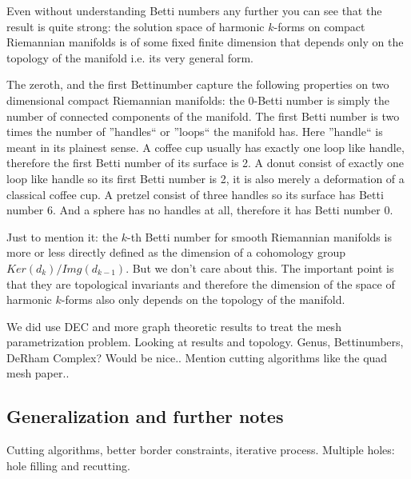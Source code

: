 Even without understanding Betti numbers any further you can see that the result is quite strong: the solution space of harmonic $k$-forms on compact Riemannian manifolds is of some fixed finite dimension that depends only on the topology of the manifold i.e. its very general form. 

The zeroth, and the first Bettinumber capture the following properties on two dimensional compact Riemannian manifolds: the 0-Betti number is simply the number of connected components of the manifold. The first Betti number is two times the number of ''handles`` or ''loops`` the manifold has. Here ''handle`` is meant in its plainest sense. A coffee cup usually has exactly one loop like handle, therefore the first Betti number of its surface is 2. A donut consist of exactly one loop like handle so its first Betti number is 2, it is also merely a deformation of a classical coffee cup. A pretzel consist of three handles so its surface has Betti number 6. And a sphere has no handles at all, therefore it has Betti number 0. 


Just to mention it: the $k$-th Betti number for smooth Riemannian manifolds is more or less directly defined as the dimension of a cohomology group $Ker(d_k)/Img(d_{k-1})$. But we don't care about this. The important point is that they are topological invariants and therefore the dimension of the space of harmonic $k$-forms also only depends on the topology of the manifold.




We did use DEC and more graph theoretic results to treat the mesh parametrization problem. 
		Looking at results and topology. Genus, Bettinumbers, DeRham Complex?	Would be nice..
		Mention cutting algorithms like the quad mesh paper..
		
\subsection{Generalization and further notes}
Cutting algorithms, better border constraints, iterative process. Multiple holes: hole filling and recutting.

